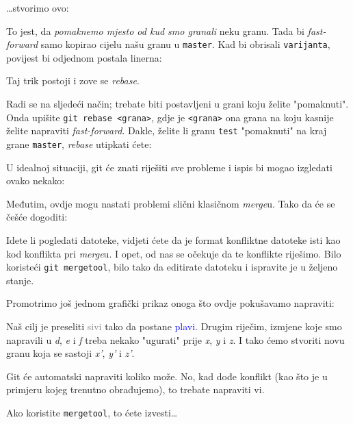 

\dots{}stvorimo ovo:



To jest, da \emph{pomaknemo mjesto od kud smo granali} neku granu. 
Tada bi \emph{fast-forward} samo kopirao cijelu našu granu u \verb+master+.
Kad bi obrisali \verb+varijanta+, povijest bi odjednom postala linerna:



Taj trik postoji i zove se \emph{rebase}.

Radi se na sljedeći način; trebate biti postavljeni u grani koju želite "pomaknuti". Onda upišite \verb+git rebase <grana>+, gdje je \verb+<grana>+ ona grana na koju kasnije želite napraviti \emph{fast-forward}. 
Dakle, želite li granu \verb+test+ "pomaknuti" na kraj grane \verb+master+, \emph{rebase} utipkati ćete:


U idealnoj situaciji, git će znati riješiti sve probleme i ispis bi mogao izgledati ovako nekako:



Međutim, ovdje mogu nastati problemi slični klasičnom \emph{merge}u.
Tako da će se češće dogoditi:



Idete li pogledati datoteke, vidjeti ćete da je format konfliktne datoteke isti kao kod konflikta pri \emph{merge}u.
I opet, od nas se očekuje da te konflikte riješimo.
Bilo koristeći \verb+git mergetool+, bilo tako da editirate datoteku i ispravite je u željeno stanje. 

Promotrimo još jednom grafički prikaz onoga što ovdje pokušavamo napraviti:



Naš cilj je preseliti \textcolor{gray}{sivi} tako da postane \textcolor{blue}{plavi}.
Drugim riječim, izmjene koje smo napravili u \emph d, \emph e i \emph f treba nekako "ugurati" prije \emph x, \emph y i \emph z.
I tako ćemo stvoriti novu granu koja se sastoji \emph{x'}, \emph{y'} i \emph{z'}.

Git će automatski napraviti koliko može.
No, kad dođe konflikt (kao što je u primjeru kojeg trenutno obrađujemo), to trebate napraviti vi.

Ako koristite \verb+mergetool+, to ćete izvesti\dots

